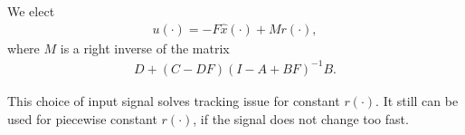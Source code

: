 We elect
\begin{align}
u(\cdot) = -F\hat{x}(\cdot) + Mr(\cdot), 
\end{align}
where $M$ is a right inverse of the matrix 
\begin{align}
D + (C - D F) (I - A + B F)^{-1} B.
\end{align}

This choice of input signal 
solves tracking issue for constant $r(\cdot)$. It still can be used for piecewise constant $r(\cdot)$, if the signal does not change too fast.















 
 
 









